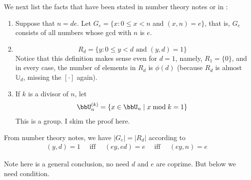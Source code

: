 \documentclass{article}
\begin{document}
We next list the facts that have been stated in number theory notes or in \cite{gallian2021contemporary}:
\begin{enumerate}
    \item \begin{defa}
Suppose that $n=de$. Let $G_{e}=\{x: 0 \leq x<n$ and $(x, n)=e\}$, that is, $G_{e}$ consists of all numbers whose gcd with $n$ is $e$.
\end{defa}
\item \begin{defa}
$$
R_{d}=\{y: 0 \leq y<d \text { and }(y, d)=1\}
$$
Notice that this definition makes sense even for $d=1$, namely, $R_{1}=\{0\}$, and in every case, the number of elements in $R_{d}$ is $\phi(d)$ (because $R_{d}$ is almost $\mathbb{U}_{d}$, missing the $[\cdot]$ again). 
\end{defa}
\item \begin{defa}
 If $k$ is a divisor of $n$, let
$$
\bbU_{n}^{(k)}=\{x \in \bbU_n \mid x \bmod k=1\}
$$
This is a group. I skim the proof here.
\end{defa}
\end{enumerate}

\begin{lema}
From  number theory notes, we have $|G_e|=|R_d|$ according to 
\begin{align}
    (y, d)=1 \quad \text { iff } \quad(e y, e d)=e \quad \text { iff } \quad(e y, n)=e\label{eq:qijnnd}
\end{align}
\end{lema}
\begin{rema}
Note here is a general conclusion, no need $d$ and $e$ are coprime. But below we need  condition.
\end{rema}
\end{document}
